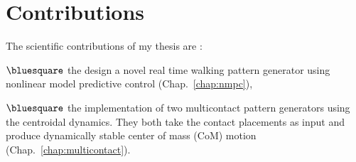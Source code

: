 \section*{Contributions}
\label{section:contribution}

The scientific contributions of my thesis are :
\begin{list}{ .}{%
		\setlength{\topsep}{5pt}%
		\setlength{\itemsep}{0pt}%
		\setlength{\parsep}{0pt}%
		\setlength{\labelwidth}{3.em}%
		\setlength{\leftmargin}{2em}%
		\setlength{\labelsep}{0.5em}%
	}
\item[$\bluesquare$] the design a novel real time walking pattern generator using nonlinear model predictive control (Chap.~\ref{chap:nmpc}),
\item[$\bluesquare$] the implementation of two multicontact pattern generators using the centroidal dynamics. They both take the contact placements as input and produce dynamically stable center of mass (CoM) motion (Chap.~\ref{chap:multicontact}).
\end{list}

